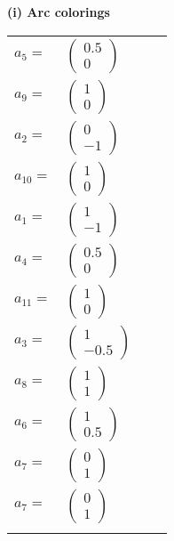 \documentclass[1p]{elsarticle_modified}
\theoremstyle{definition}
\begin{document}
\flushleft \textbf{(i) Arc colorings}\\
\begin{tabular}{m{7pt} m{180pt} m{7pt} m{180pt} }
\flushright $a_{5}=$&$\begin{pmatrix}0.5\\0\end{pmatrix}$ \\
\flushright $a_{9}=$&$\begin{pmatrix}1\\0\end{pmatrix}$ \\
\flushright $a_{2}=$&$\begin{pmatrix}0\\-1\end{pmatrix}$ \\
\flushright $a_{10}=$&$\begin{pmatrix}1\\0\end{pmatrix}$ \\
\flushright $a_{1}=$&$\begin{pmatrix}1\\-1\end{pmatrix}$ \\
\flushright $a_{4}=$&$\begin{pmatrix}0.5\\0\end{pmatrix}$ \\
\flushright $a_{11}=$&$\begin{pmatrix}1\\0\end{pmatrix}$ \\
\flushright $a_{3}=$&$\begin{pmatrix}1\\-0.5\end{pmatrix}$ \\
\flushright $a_{8}=$&$\begin{pmatrix}1\\1\end{pmatrix}$ \\
\flushright $a_{6}=$&$\begin{pmatrix}1\\0.5\end{pmatrix}$ \\
\flushright $a_{7}=$&$\begin{pmatrix}0\\1\end{pmatrix}$\\ \flushright $a_{7}=$&$\begin{pmatrix}0\\1\end{pmatrix}$\\&\end{tabular}
\end{document}
